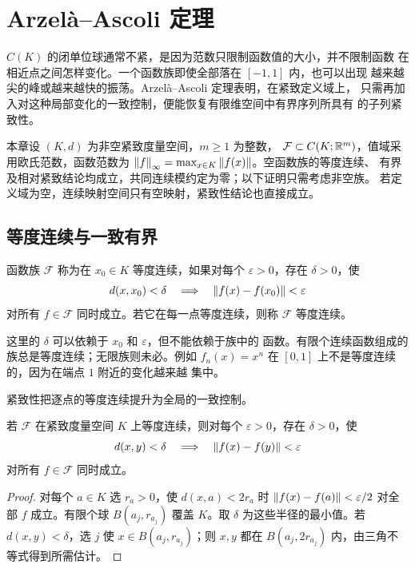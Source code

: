 \chapter{Arzelà--Ascoli 定理}
\label{chap:arzela-ascoli}

$C(K)$ 的闭单位球通常不紧，是因为范数只限制函数值的大小，并不限制函数
在相近点之间怎样变化。一个函数族即使全部落在 $[-1,1]$ 内，也可以出现
越来越尖的峰或越来越快的振荡。Arzelà--Ascoli 定理表明，在紧致定义域上，
只需再加入对这种局部变化的一致控制，便能恢复有限维空间中有界序列所具有
的子列紧致性。

本章设 $(K,d)$ 为非空紧致度量空间，$m\ge1$ 为整数，
$\mathcal F\subset C(K;\mathbb{R}^m)$，值域采用欧氏范数，函数范数为
$\left\lVert f\right\rVert_\infty=\max_{x\in K}\left\lVert f(x)\right\rVert$。空函数族的等度连续、
有界及相对紧致结论均成立，共同连续模约定为零；以下证明只需考虑非空族。
若定义域为空，连续映射空间只有空映射，紧致性结论也直接成立。

\section{等度连续与一致有界}

\begin{definition}
\label{def:equicontinuity}
函数族 $\mathcal F$ 称为在 $x_0\in K$ 等度连续，如果对每个
$\varepsilon>0$，存在 $\delta>0$，使
\[
 d(x,x_0)<\delta\quad\Longrightarrow\quad
 \left\lVert f(x)-f(x_0)\right\rVert<\varepsilon
\]
对所有 $f\in\mathcal F$ 同时成立。若它在每一点等度连续，则称
$\mathcal F$ 等度连续。
\end{definition}

这里的 $\delta$ 可以依赖于 $x_0$ 和 $\varepsilon$，但不能依赖于族中的
函数。有限个连续函数组成的族总是等度连续；无限族则未必。例如
$f_n(x)=x^n$ 在 $[0,1]$ 上不是等度连续的，因为在端点 $1$ 附近的变化越来越
集中。

紧致性把逐点的等度连续提升为全局的一致控制。

\begin{proposition}
\label{prop:equicontinuity-uniform-on-compact}
若 $\mathcal F$ 在紧致度量空间 $K$ 上等度连续，则对每个
$\varepsilon>0$，存在 $\delta>0$，使
\[
 d(x,y)<\delta\quad\Longrightarrow\quad
 \left\lVert f(x)-f(y)\right\rVert<\varepsilon
\]
对所有 $f\in\mathcal F$ 同时成立。
\end{proposition}

\begin{proof}
对每个 $a\in K$ 选 $r_a>0$，使 $d(x,a)<2r_a$ 时
$\left\lVert f(x)-f(a)\right\rVert<\varepsilon/2$ 对全部 $f$ 成立。有限个球
$B(a_j,r_{a_j})$ 覆盖 $K$。取 $\delta$ 为这些半径的最小值。若
$d(x,y)<\delta$，选 $j$ 使 $x\in B(a_j,r_{a_j})$；则 $x,y$ 都在
$B(a_j,2r_{a_j})$ 内，由三角不等式得到所需估计。
\end{proof}

